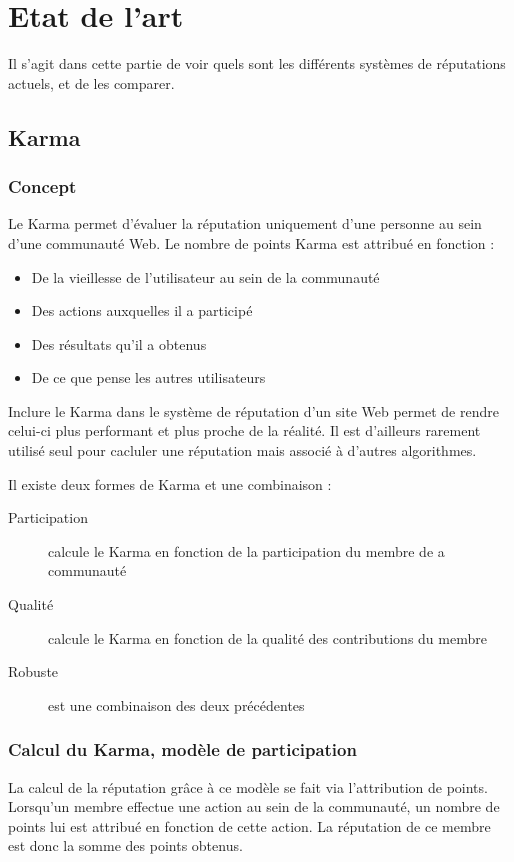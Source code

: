 \documentclass[a4paper, 11pt]{article} %
\begin{document}
\section{Etat de l'art}
Il s'agit dans cette partie de voir quels sont les différents systèmes de réputations actuels, et de les comparer.


\subsection{Karma}
\subsubsection{Concept}
Le Karma permet d'évaluer la réputation uniquement d'une personne au sein d'une communauté Web. Le nombre de points Karma est attribué en fonction :
\begin{itemize}
	\item De la vieillesse de l'utilisateur au sein de la communauté
	\item Des actions auxquelles il a participé
	\item Des résultats qu'il a obtenus
	\item De ce que pense les autres utilisateurs
\end{itemize}
Inclure le Karma dans le système de réputation d'un site Web permet de rendre celui-ci plus performant et plus proche de la réalité. Il est d'ailleurs rarement utilisé seul pour cacluler une réputation mais associé à d'autres algorithmes.

Il existe deux formes de Karma et une combinaison :
\begin{description}
	\item[Participation] calcule le Karma en fonction de la participation du membre de a communauté
	\item[Qualité] calcule le Karma en fonction de la qualité des contributions du membre
	\item[Robuste] est une combinaison des deux précédentes
\end{description}

\subsubsection{Calcul du Karma, modèle de participation}
La calcul de la réputation grâce à ce modèle se fait via l'attribution de points. Lorsqu'un membre effectue une action au sein de la communauté, un nombre de points lui est attribué en fonction de cette action. La réputation de ce membre est donc la somme des points obtenus.
\end{document}
